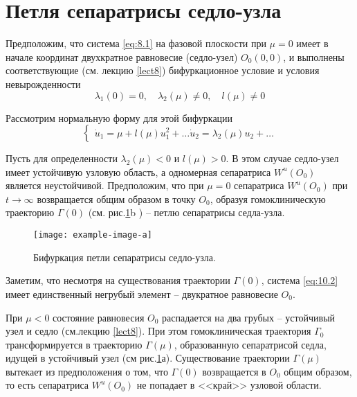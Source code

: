 \section{Петля сепаратрисы седло-узла}%
\label{sec:10.1}

Предположим, что система \eqref{eq:8.1} на фазовой плоскости при $\mu=0$ имеет в начале координат двухкратное равновесие (седло-узел) $O_0(0,0)$, и выполнены соответствующие (см. лекцию \ref{lect8})
бифуркационное условие и условия невырожденности
\begin{equation}
        \label{eq:10.1}
        \lambda_1(0) = 0, \quad \lambda_2(\mu) \neq 0, \quad l(\mu) \neq 0
\end{equation}

Рассмотрим нормальную форму для этой бифуркации
\begin{equation}
        \label{eq:10.2}
        \begin{cases}
                \dot u_1 = \mu + l(\mu) u_1^2 + \dots 
                \dot u_2 = \lambda_2(\mu) u_2 + \dots
        \end{cases}
\end{equation}

Пусть для определенности $\lambda_2(\mu) < 0$ и $l(\mu) > 0$. В этом случае седло-узел
имеет устойчивую узловую область, а одномерная сепаратриса $W^u(O_0)$ 
является неустойчивой. Предположим, что при $\mu=0$ сепаратриса $W^u(O_0)$ при $t \to \infty$ возвращается общим образом в точку $O_0$, образуя гомоклиническую траекторию
$\Gamma(0)$ (см. рис.\ref{fig:10.1}b ) -- петлю сепаратрисы седла-узла.
\begin{figure}[h]
        \centering
        \texttt{[image: example-image-a]}
        \caption{Бифуркация петли сепаратрисы седло-узла.}
        \label{fig:10.1}
\end{figure}

Заметим, что несмотря на существования траектории $\Gamma(0)$, система \eqref{eq:10.2} имеет единственный негрубый элемент -- двукратное равновесие $O_0.$

При $\mu<0$ состояние равновесия $O_0$ распадается на два грубых -- устойчивый узел и 
седло (см.лекцию \ref{lect8}). При этом гомоклиническая траектория $\Gamma_0$ трансформируется в траекторию
$\Gamma(\mu)$, образованную сепаратрисой седла, идущей в устойчивый узел (см рис.\ref{fig:10.1}а). Существование траектории $\Gamma(\mu)$ вытекает из предположения о том, что $\Gamma(0)$ возвращается в $O_0$ общим  образом, то есть сепаратриса $W^u(O_0)$ не попадает в <<край>> 
узловой области.

